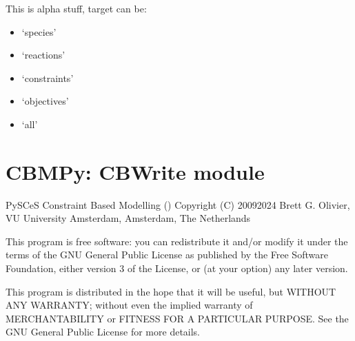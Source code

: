 \documentclass[letterpaper,10pt,english]{sphinxmanual}
\begin{document}

\begin{fulllineitems}
\label{\detokenize{modules_doc:cbmpy.CBTools.stringReplace}}
\pysigstartsignatures
{}
\pysigstopsignatures
\sphinxAtStartPar
This is alpha stuff, target can be:
\begin{itemize}
\item {} 
\sphinxAtStartPar
‘species’

\item {} 
\sphinxAtStartPar
‘reactions’

\item {} 
\sphinxAtStartPar
‘constraints’

\item {} 
\sphinxAtStartPar
‘objectives’

\item {} 
\sphinxAtStartPar
‘all’

\end{itemize}

\end{fulllineitems}

\label{\detokenize{modules_doc:module-cbmpy.CBWrite}}

\section{CBMPy: CBWrite module}
\label{\detokenize{modules_doc:cbmpy-cbwrite-module}}
\sphinxAtStartPar
PySCeS Constraint Based Modelling ()
Copyright (C) 2009\sphinxhyphen{}2024 Brett G. Olivier, VU University Amsterdam, Amsterdam, The Netherlands

\sphinxAtStartPar
This program is free software: you can redistribute it and/or modify
it under the terms of the GNU General Public License as published by
the Free Software Foundation, either version 3 of the License, or
(at your option) any later version.

\sphinxAtStartPar
This program is distributed in the hope that it will be useful,
but WITHOUT ANY WARRANTY; without even the implied warranty of
MERCHANTABILITY or FITNESS FOR A PARTICULAR PURPOSE.  See the
GNU General Public License for more details.
\end{document}

